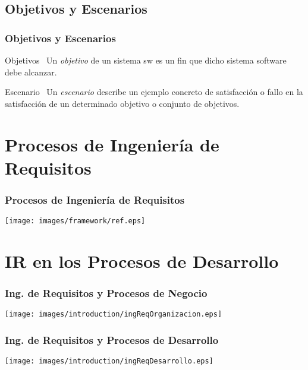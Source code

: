 \documentclass[handout,a4paper,slidestop,xcolor=pst,dvips,blue]{beamer}
\begin{document}
\subsection{Objetivos y Escenarios}

\begin{frame}
    \frametitle{Objetivos y Escenarios}
    \begin{block}{Objetivos~\cite{lamsweerde:2001}}
        Un \alert{\emph{objetivo}} de un sistema sw es un fin que dicho sistema software debe alcanzar.
    \end{block}
     {
        \begin{block}{Escenario~\cite{pohl:2010}}
            Un \alert{\emph{escenario}} describe un ejemplo concreto de satisfacción o fallo en la satisfacción de un determinado objetivo o conjunto de objetivos.
        \end{block}
    }
\end{frame}

\section{Procesos de Ingeniería de Requisitos}

\begin{frame}[c]
    \frametitle{Procesos de Ingeniería de Requisitos}
    \begin{center}
		\texttt{[image: images/framework/ref.eps]}
    \end{center}
\end{frame}

\section{IR en los Procesos de Desarrollo}

\begin{frame}[c]
    \frametitle{Ing. de Requisitos y Procesos de Negocio}
    \begin{center}
			\texttt{[image: images/introduction/ingReqOrganizacion.eps]}
    \end{center}
\end{frame}

\begin{frame}
    \frametitle{Ing. de Requisitos y Procesos de Desarrollo}
    \begin{center}
			\texttt{[image: images/introduction/ingReqDesarrollo.eps]}
    \end{center}
\end{frame}
\end{document}

